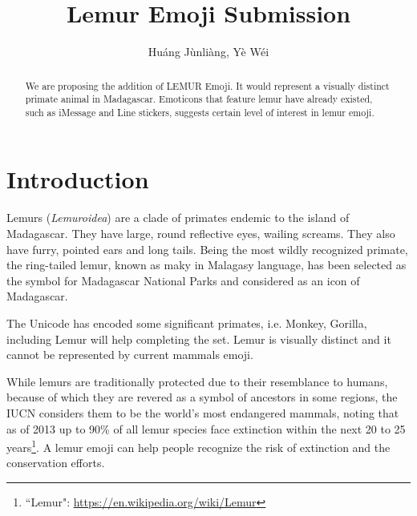 \documentclass{article}
\begin{document}
\title{Lemur Emoji Submission}
\author{Huáng Jùnliàng, Yè Wéi}
\maketitle

\begin{abstract}
    We are proposing the addition of LEMUR Emoji. It would represent a visually distinct primate animal in Madagascar. Emoticons that feature lemur have already existed, such as iMessage and Line stickers, suggests certain level of interest in lemur emoji.
\end{abstract} 

\section{Introduction}
Lemurs (\textit{Lemuroidea}) are a clade of primates endemic to the island of Madagascar. They have large, round reflective eyes, wailing screams. They also have furry, pointed ears and long tails. Being the most wildly recognized primate, the ring-tailed lemur, known as maky in Malagasy language, has been selected as the symbol for Madagascar National Parks and considered as an icon of Madagascar.

The Unicode has encoded some significant primates, i.e. Monkey, Gorilla, including Lemur will help completing the set. Lemur is visually distinct and it cannot be represented by current mammals emoji.

While lemurs are traditionally protected due to their resemblance to humans, because of which they are revered as a symbol of ancestors in some regions, the IUCN considers them to be the world's most endangered mammals, noting that as of 2013 up to 90\% of all lemur species face extinction within the next 20 to 25 years\footnote{``Lemur": \url{https://en.wikipedia.org/wiki/Lemur}}. A lemur emoji can help people recognize the risk of extinction and the conservation efforts.

\end{document}
